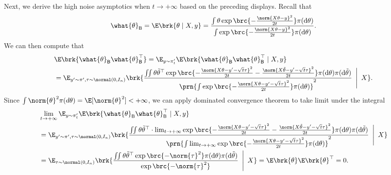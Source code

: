 \documentclass[11pt]{article}
\newcommand{\bysest}{\what{\theta}_{\mathsf{B}}}
\newcommand{\Cov}{\mathsf{Cov}}
\newcommand{\de}{\mathrm{d}}
\begin{document}
Next, we derive the high noise asymptotics when $t \to +\infty$ based on the preceding displays. Recall that
\begin{align*}
    \bysest = \E \brk{\theta \mid X, y} = \frac{\int \theta \exp \brc{-\frac{\norm{X \theta - y}^2}{2 t}} \pi(\de \theta) }{\int \exp \brc{-\frac{\norm{X \theta - y}^2}{2 t}} \pi(\de \theta) }.
\end{align*}
We can then compute that
\begin{align*}
    &\E \brk{\bysest \bysest^\top} = \E_{y \sim \pi_{t}'}{\E \brk{\bysest \bysest^\top \mid X, y}} \nonumber \\
    &= \E_{y' \sim \pi', \tau \sim \normal(0, I_n)} \brk{ \frac{\iint \theta \tilde{\theta}^\top \exp \brc{-\frac{\norm{X \theta - y' - \sqrt{t}\tau}^2}{2 t}-\frac{\norm{X \tilde{\theta} - y' - \sqrt{t} \tau}^2}{2 t}} \pi(\de \theta)\pi(\de \tilde{\theta}) }{\prn{\int \exp \brc{-\frac{\norm{X \theta - y' - \sqrt{t} \tau}^2}{2 t}} \pi(\de \theta)}^2 } \,\,\,\Bigg| \,\,\, X}.
\end{align*}
Since $\int \norm{\theta}^2 \pi(d\theta) = \E[\norm{\theta}^2] < +\infty$, we can apply dominated convergence theorem to take limit under the integral
\begin{align*}
    & \lim_{t \to +\infty} \E_{y \sim \pi_t'}{\E \brk{\bysest \bysest^\top \mid X, y}} \\
    & = \E_{y' \sim \pi', \tau \sim \normal(0, I_n)} \brk{ \frac{\iint \theta \tilde{\theta}^\top \cdot \lim_{t \to +\infty}\exp \brc{-\frac{\norm{X \theta - y' - \sqrt{t} \tau}^2}{2 t}-\frac{\norm{X \tilde{\theta} - y' - \sqrt{t} \tau}^2}{2 t}} \pi(\de \theta)\pi(\de \tilde{\theta}) }{\prn{\int \lim_{t \to +\infty} \exp \brc{-\frac{\norm{X \theta - y' - \sqrt{t} \tau}^2}{2 t}} \pi(\de \theta)}^2 } \,\,\,\Bigg| \,\,\, X} \\
    & = \E_{\tau \sim \normal(0, I_n)} \brk{ \frac{\iint \theta \tilde{\theta}^\top \exp \brc{-\norm{\tau}^2} \pi(\de \theta)\pi(\de \tilde{\theta}) }{\exp \brc{-\norm{\tau}^2}  } \,\,\,\Bigg| \,\,\, X} = \E \brk{\theta} \E \brk{\theta}^\top = 0.
\end{align*}
\end{document}
